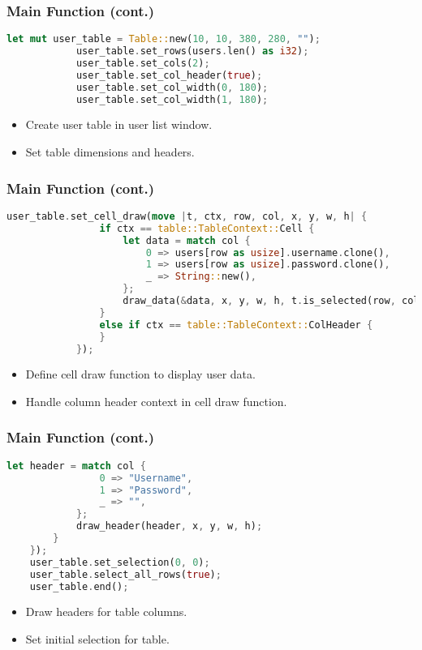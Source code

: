 \documentclass[aspectratio=169, table]{beamer}
\begin{document}
	\begin{frame}[fragile]
		\frametitle{Main Function (cont.)}
		\begin{lstlisting}[language=Rust]
			let mut user_table = Table::new(10, 10, 380, 280, "");
			user_table.set_rows(users.len() as i32);
			user_table.set_cols(2);
			user_table.set_col_header(true);
			user_table.set_col_width(0, 180);
			user_table.set_col_width(1, 180);
		\end{lstlisting}
		\begin{itemize}
			\item Create user table in user list window.
			\item Set table dimensions and headers.
		\end{itemize}
	\end{frame}
	
	\begin{frame}[fragile]
		\frametitle{Main Function (cont.)}
		\begin{lstlisting}[language=Rust]
			user_table.set_cell_draw(move |t, ctx, row, col, x, y, w, h| {
				if ctx == table::TableContext::Cell {
					let data = match col {
						0 => users[row as usize].username.clone(),
						1 => users[row as usize].password.clone(),
						_ => String::new(),
					};
					draw_data(&data, x, y, w, h, t.is_selected(row, col));
				} 
				else if ctx == table::TableContext::ColHeader {
				}
			});
		\end{lstlisting}
		\begin{itemize}
			\item Define cell draw function to display user data.
			\item Handle column header context in cell draw function.
		\end{itemize}
	\end{frame}
	
	
	\begin{frame}[fragile]
		\frametitle{Main Function (cont.)}
		\begin{lstlisting}[language=Rust]
			let header = match col {
				0 => "Username",
				1 => "Password",
				_ => "",
			};
			draw_header(header, x, y, w, h);
		}
	});
	user_table.set_selection(0, 0);
	user_table.select_all_rows(true);
	user_table.end();
\end{lstlisting}
\begin{itemize}
	\item Draw headers for table columns.
	\item Set initial selection for table.
\end{itemize}
\end{frame}
\end{document}
